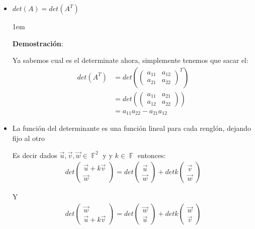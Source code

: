 \documentclass[12pt, fleqn]{report}                             %
\newenvironment{SmallIndentation}[1][0.75em]                    %
        {\begin{adjustwidth}{#1}{}\begin{footnotesize}}             %
        {\end{footnotesize}\end{adjustwidth}}                       %
\theoremstyle{break}                                            %
\DeclareMathOperator \GenericField {\mathbb{F}}                 %
\newcommand{\Wrap}[1]    {\left( #1 \right)}                    %
\newcommand{\pVector}[1]                                        %
        { \ensuremath{\begin{pmatrix}#1\end{pmatrix}} }             %
\begin{document}
            \begin{itemize}

                \item
                    $det(A) = det(A^T)$

                    \begin{SmallIndentation}[1em]
                        \textbf{Demostración}:
                        
                        Ya sabemos cual es el determinate ahora, simplemente
                        tenemos que sacar el:
                        \begin{align*}
                            det\Wrap{A^T}
                                &= det\Wrap{\pVector{a_{11} & a_{12} \\ a_{21} & a_{22}}^T}     \\
                                &= det\Wrap{\pVector{a_{11} & a_{21} \\ a_{12} & a_{22}}}       \\
                                &= a_{11} a_{22} - a_{21} a_{12}
                        \end{align*}
                    
                    \end{SmallIndentation}
                        

                \item 
                    La función del determinante es una función lineal
                    para cada renglón, dejando fijo al otro

                    Es decir dados $\vec u, \vec v, \vec w \in \GenericField^2$ y
                    y $k \in \GenericField$ entonces:
                    \begin{align*}
                        det \pVector{\vec u + k\vec v \\ \vec w}
                            =  det \pVector{\vec u \\ \vec w}
                            + det k\pVector{\vec v \\ \vec w}
                    \end{align*}

                    Y 
                    \begin{align*}
                        det \pVector{\vec w \\ \vec u + k\vec v}
                            =  det \pVector{\vec w  \\ \vec u}
                            + det k\pVector{\vec w  \\ \vec v}
                    \end{align*}



\end{itemize}
\end{document}
